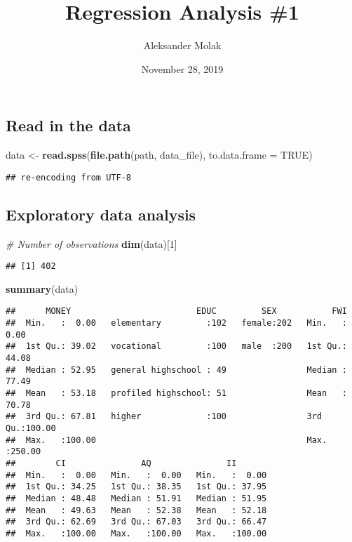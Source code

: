 \documentclass[]{article}
\title{Regression Analysis \#1}
\author{Aleksander Molak}
\date{November 28, 2019}
\newenvironment{Shaded}{\begin{snugshade}}{\end{snugshade}}
\newcommand{\CommentTok}[1]{\textcolor[rgb]{0.56,0.35,0.01}{\textit{#1}}}
\newcommand{\DataTypeTok}[1]{\textcolor[rgb]{0.13,0.29,0.53}{#1}}
\newcommand{\DecValTok}[1]{\textcolor[rgb]{0.00,0.00,0.81}{#1}}
\newcommand{\KeywordTok}[1]{\textcolor[rgb]{0.13,0.29,0.53}{\textbf{#1}}}
\newcommand{\NormalTok}[1]{#1}
\newcommand{\OtherTok}[1]{\textcolor[rgb]{0.56,0.35,0.01}{#1}}
\newcommand{\StringTok}[1]{\textcolor[rgb]{0.31,0.60,0.02}{#1}}
\begin{document}
\maketitle

\hypertarget{read-in-the-data}{%
\subsection{Read in the data}\label{read-in-the-data}}

\begin{Shaded}
\begin{Highlighting}[]
\NormalTok{data <-}\StringTok{ }\KeywordTok{read.spss}\NormalTok{(}\KeywordTok{file.path}\NormalTok{(path, data_file), }\DataTypeTok{to.data.frame =} \OtherTok{TRUE}\NormalTok{)}
\end{Highlighting}
\end{Shaded}

\begin{verbatim}
## re-encoding from UTF-8
\end{verbatim}

\hypertarget{exploratory-data-analysis}{%
\subsection{Exploratory data analysis}\label{exploratory-data-analysis}}

\begin{Shaded}
\begin{Highlighting}[]
\CommentTok{# Number of observations}
\KeywordTok{dim}\NormalTok{(data)[}\DecValTok{1}\NormalTok{]}
\end{Highlighting}
\end{Shaded}

\begin{verbatim}
## [1] 402
\end{verbatim}

\begin{Shaded}
\begin{Highlighting}[]
\KeywordTok{summary}\NormalTok{(data)}
\end{Highlighting}
\end{Shaded}

\begin{verbatim}
##      MONEY                         EDUC         SEX           FWI        
##  Min.   :  0.00   elementary         :102   female:202   Min.   :  0.00  
##  1st Qu.: 39.02   vocational         :100   male  :200   1st Qu.: 44.08  
##  Median : 52.95   general highschool : 49                Median : 77.49  
##  Mean   : 53.18   profiled highschool: 51                Mean   : 70.78  
##  3rd Qu.: 67.81   higher             :100                3rd Qu.:100.00  
##  Max.   :100.00                                          Max.   :250.00  
##        CI               AQ               II        
##  Min.   :  0.00   Min.   :  0.00   Min.   :  0.00  
##  1st Qu.: 34.25   1st Qu.: 38.35   1st Qu.: 37.95  
##  Median : 48.48   Median : 51.91   Median : 51.95  
##  Mean   : 49.63   Mean   : 52.38   Mean   : 52.18  
##  3rd Qu.: 62.69   3rd Qu.: 67.03   3rd Qu.: 66.47  
##  Max.   :100.00   Max.   :100.00   Max.   :100.00
\end{verbatim}
\end{document}
